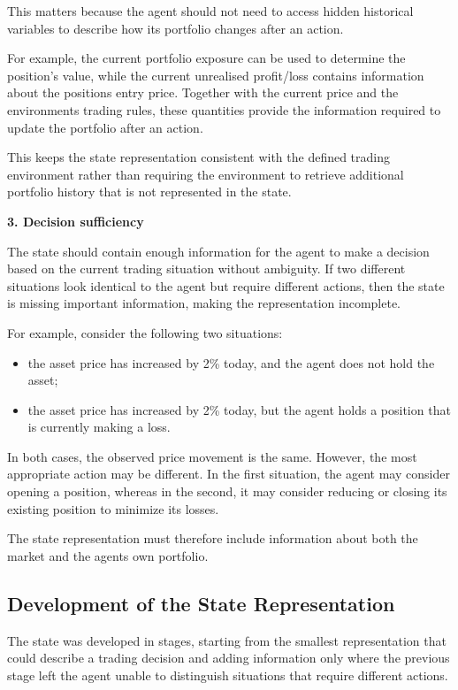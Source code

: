 This matters because the agent should not need to access hidden
historical variables to describe how its portfolio changes after an
action.

For example, the current portfolio exposure can be used to determine the
position's value, while the current unrealised profit/loss contains
information about the position\textquotesingle s entry price. Together
with the current price and the environment\textquotesingle s trading
rules, these quantities provide the information required to update the
portfolio after an action.

This keeps the state representation consistent with the defined trading
environment rather than requiring the environment to retrieve additional
portfolio history that is not represented in the state.

\textbf{3. Decision sufficiency}

The state should contain enough information for the agent to make a
decision based on the current trading situation without ambiguity. If
two different situations look identical to the agent but require
different actions, then the state is missing important information,
making the representation incomplete.

For example, consider the following two situations:

\begin{itemize}
\item
  the asset price has increased by 2\% today, and the agent does not
  hold the asset;
\item
  the asset price has increased by 2\% today, but the agent holds a
  position that is currently making a loss.
\end{itemize}

In both cases, the observed price movement is the same. However, the
most appropriate action may be different. In the first situation, the
agent may consider opening a position, whereas in the second, it may
consider reducing or closing its existing position to minimize its
losses.

The state representation must therefore include information about both
the market and the agent\textquotesingle s own portfolio.

\subsection{Development of the State Representation}

The state was developed in stages, starting from the smallest
representation that could describe a trading decision and adding
information only where the previous stage left the agent unable to
distinguish situations that require different actions.

